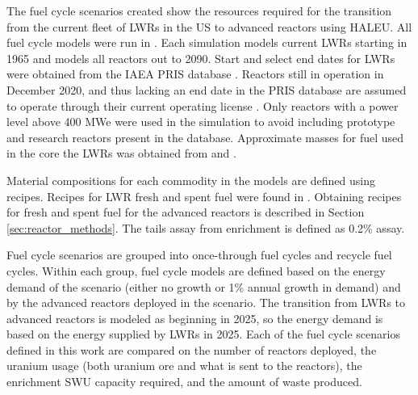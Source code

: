The fuel cycle scenarios created show the resources required for the transition from the 
current fleet of \glspl{LWR} in the US to advanced reactors using \gls{HALEU}.
All fuel cycle models were run in \Cyclus 
\cite{huff_fundamental_2016}. Each simulation models current 
\glspl{LWR} starting in 1965 and models all reactors out to 2090. Start 
and select end dates for \glspl{LWR} were obtained from the \gls{IAEA} \gls{PRIS} database 
\cite{noauthor_power_1989}. Reactors still in operation in December 2020, and thus 
lacking an end date in the \gls{PRIS} database are assumed to operate through their 
current operating license 
\cite{noauthor_us_nodate}.
Only reactors with a power level above 400 MWe were used in the simulation 
to avoid including prototype and research reactors present in the database. 
Approximate masses for fuel used in the core the \glspl{LWR} was obtained 
from \cite{todreas_nuclear_2012} and \cite{cacuci_handbook_2010}. 

Material compositions for each commodity in the models are defined using recipes.
Recipes for \gls{LWR} fresh and spent fuel were found in \cite{jacobson_verifiable_2010}.
Obtaining recipes for fresh and spent fuel for the advanced reactors is described in 
Section \ref{sec:reactor_methods}. The tails assay from enrichment is defined as 
0.2\% assay. 

Fuel cycle scenarios are grouped into once-through fuel cycles and recycle fuel 
cycles. Within each group, fuel cycle models are defined based on the energy demand 
of the scenario (either no growth or 1\% annual growth in demand) and by the 
advanced reactors deployed in the scenario. The transition from \glspl{LWR} to 
advanced reactors is modeled as beginning in 2025, so the energy demand is based on the 
energy supplied by \glspl{LWR} in 2025. Each of the fuel cycle scenarios 
defined in this work are compared on the number of reactors deployed, the 
uranium usage (both uranium ore and what is sent to the reactors), the enrichment 
\gls{SWU} capacity required, and the amount of waste produced. 

